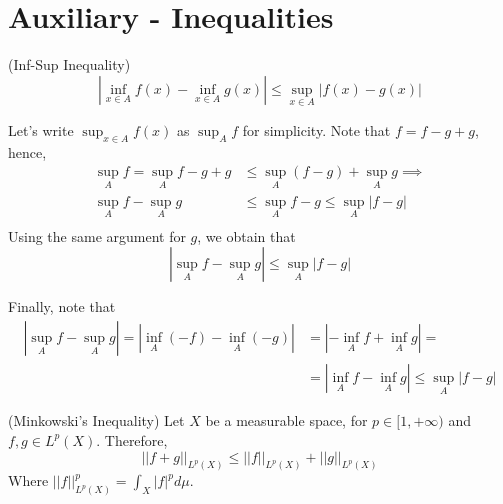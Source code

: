 \section{Auxiliary - Inequalities}

\begin{lemma}(Inf-Sup Inequality)
	\begin{equation}
		|\inf_{x \in A} f(x) - \inf_{x \in A} g(x)| \leq
		\sup_{x \in A}|f(x)- g(x)|
	\end{equation}
	\label{lem:infsup_ineq}
\end{lemma}
\begin{prf}
	Let's write $\sup_{x \in A}f(x)$ as $\sup_A f$ for simplicity.
	Note that $f = f - g + g$, hence,
	\begin{align*}
		\sup_A f = \sup_A f - g + g & \leq
		\sup_A (f-g) + \sup_A g \implies   \\
		\sup_A f - \sup_A g         & \leq
		\sup_A f-g \leq \sup_A |f-g|       \\
	\end{align*}
	Using the same argument for $g$, we obtain that
	\begin{equation}
		|\sup_A f - \sup_A g| \leq \sup_A |f-g|
	\end{equation}

	Finally, note that
	\begin{align*}
		|\sup_A f - \sup_A g| =
		|\inf_A (-f) - \inf_A (-g)| & =
		|-\inf_A f + \inf_A g| =                                                \\
		                            & =|\inf_A f - \inf_A g | \leq \sup_A |f-g|
	\end{align*}
\end{prf}

\begin{lemma} (Minkowski's Inequality)
	Let $X$ be a measurable space, for $p \in [1,+\infty)$ and $f,g \in L^p(X)$. Therefore,
	\begin{equation}
		||f + g||_{L^p(X)} \leq
		||f||_{L^p(X)} + 
		||g||_{L^p(X)}
	\end{equation}
	Where $||f||_{L^p(X)}^p = \int_X |f|^p d\mu$.
	\label{lem:minkowski}
\end{lemma}